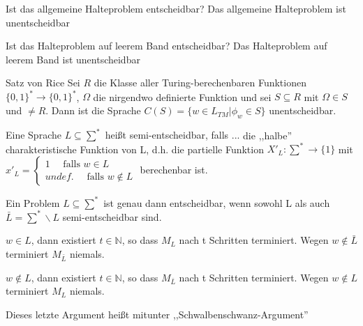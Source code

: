 \documentclass[avery5371, frame]{flashcards}
\begin{document}
\begin{flashcard}[Satz]{Ist das allgemeine Halteproblem entscheidbar?}
    Das allgemeine Halteproblem ist unentscheidbar
\end{flashcard}

\begin{flashcard}[Satz]{Ist das Halteproblem auf leerem Band entscheidbar?}
    Das Halteproblem auf leerem Band ist unentscheidbar
\end{flashcard}

\begin{flashcard}[Satz]{ Satz von Rice }
    Sei $R$ die Klasse aller Turing-berechenbaren Funktionen $\{0,1\}^*\rightarrow\{0,1\}^*$, $\Omega$ die nirgendwo definierte Funktion und sei $S\subseteq R$ mit $\Omega\in S$ und $\not = R$. Dann ist die Sprache $C(S)=\{w\in L_{TM} | \phi_w\in S\}$ unentscheidbar.
\end{flashcard}

\begin{flashcard}[Definition]{Eine Sprache $L\subseteq \sum^*$ heißt semi-entscheidbar, falls ...}
    die ,,halbe'' charakteristische Funktion von L, d.h. die partielle Funktion $X'_L:\sum^* \rightarrow \{1\}$ mit $x'_L=\begin{cases} 1 \quad\text{ falls } w\in L\\ undef. \quad\text{ falls } w\not\in L \end{cases}$ berechenbar ist.
\end{flashcard}

\begin{flashcard}[Satz]{Ein Problem $L\subseteq \sum^*$ ist genau dann entscheidbar, wenn }
    sowohl L als auch $\bar{L}=\sum^*\backslash L$ semi-entscheidbar sind.
    \begin{enumerate*}
        \item $w\in L$, dann existiert $t\in\mathbb{N}$, so dass $M_L$ nach t Schritten terminiert. Wegen $w\not\in\bar{L}$ terminiert $M_{\bar{L}}$ niemals.
        \item $w\not\in L$, dann existiert $t\in\mathbb{N}$, so dass $M_{\bar{L}}$ nach t Schritten terminiert. Wegen $w\not\in L$ terminiert $M_L$ niemals.
    \end{enumerate*}
    Dieses letzte Argument heißt mitunter ,,Schwalbenschwanz-Argument''
\end{flashcard}
\end{document}
